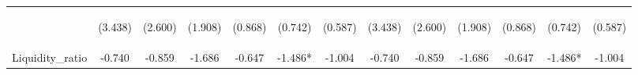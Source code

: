 \documentclass[]{article}
\begin{document}
\begin{center}
\begin{tabular}{lcccccccccccc}
\vspace{4pt} & \begin{footnotesize}(3.438)\end{footnotesize} & \begin{footnotesize}(2.600)\end{footnotesize} & \begin{footnotesize}(1.908)\end{footnotesize} & \begin{footnotesize}(0.868)\end{footnotesize} & \begin{footnotesize}(0.742)\end{footnotesize} & \begin{footnotesize}(0.587)\end{footnotesize} & \begin{footnotesize}(3.438)\end{footnotesize} & \begin{footnotesize}(2.600)\end{footnotesize} & \begin{footnotesize}(1.908)\end{footnotesize} & \begin{footnotesize}(0.868)\end{footnotesize} & \begin{footnotesize}(0.742)\end{footnotesize} & \begin{footnotesize}(0.587)\end{footnotesize} \\
Liquidity\_ratio & -0.740 & -0.859 & -1.686 & -0.647 & -1.486* & -1.004 & -0.740 & -0.859 & -1.686 & -0.647 & -1.486* & -1.004 \\

\end{tabular}
\end{center}
\end{document}

